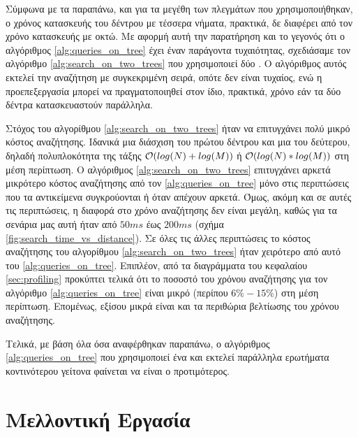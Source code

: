 Σύμφωνα με τα παραπάνω, και για τα μεγέθη των πλεγμάτων που χρησιμοποιήθηκαν, 
ο χρόνος κατασκευής του δέντρου με τέσσερα νήματα, πρακτικά, δε διαφέρει 
από τον χρόνο κατασκευής με οκτώ. 
Με αφορμή αυτή την παρατήρηση και το γεγονός ότι ο αλγόριθμος \ref{alg:queries_on_tree}
έχει έναν παράγοντα τυχαιότητας, σχεδιάσαμε τον αλγόριθμο \ref{alg:search_on_two_trees}
που χρησιμοποιεί δύο .
Ο αλγόριθμος αυτός εκτελεί την αναζήτηση με συγκεκριμένη σειρά, οπότε δεν είναι τυχαίος,
ενώ η προεπεξεργασία μπορεί να πραγματοποιηθεί στον ίδιο, πρακτικά, χρόνο εάν τα 
δύο δέντρα κατασκευαστούν παράλληλα.

Στόχος του αλγορίθμου \ref{alg:search_on_two_trees} ήταν να επιτυγχάνει πολύ 
μικρό κόστος αναζήτησης. 
Ιδανικά μια διάσχιση του πρώτου δέντρου και μια του δεύτερου, δηλαδή πολυπλοκότητα 
της τάξης $\mathcal{O}(log(N) + log(M))$ ή $\mathcal{O}(log(N) * log(M))$ στη 
μέση περίπτωση.
Ο αλγόριθμος \ref{alg:search_on_two_trees} επιτυγχάνει αρκετά μικρότερο κόστος 
αναζήτησης από τον \ref{alg:queries_on_tree} μόνο στις περιπτώσεις 
που τα αντικείμενα συγκρούονται ή όταν απέχουν αρκετά.
Όμως, ακόμη και σε αυτές τις περιπτώσεις, η διαφορά στο χρόνο αναζήτησης 
δεν είναι μεγάλη, καθώς για τα σενάρια μας αυτή 
ήταν από $50ms$ έως $200ms$ (σχήμα \ref{fig:search_time_vs_distance}).
Σε όλες τις άλλες περιπτώσεις το κόστος αναζήτησης του αλγορίθμου 
\ref{alg:search_on_two_trees} ήταν χειρότερο από αυτό του \ref{alg:queries_on_tree}.
Επιπλέον, από τα διαγράμματα του κεφαλαίου \ref{sec:profiling} προκύπτει τελικά 
ότι το ποσοστό του χρόνου αναζήτησης για τον αλγόριθμο \ref{alg:queries_on_tree}
είναι μικρό (περίπου $6\% - 15\%$) στη μέση περίπτωση.
Επομένως, εξίσου μικρά είναι και τα περιθώρια βελτίωσης του χρόνου αναζήτησης.

Τελικά, με βάση όλα όσα αναφέρθηκαν παραπάνω, ο αλγόριθμος \ref{alg:queries_on_tree} 
που χρησιμοποιεί ένα  και εκτελεί παράλληλα ερωτήματα κοντινότερου 
γείτονα φαίνεται να είναι ο προτιμότερος.


\section{Μελλοντική Εργασία}